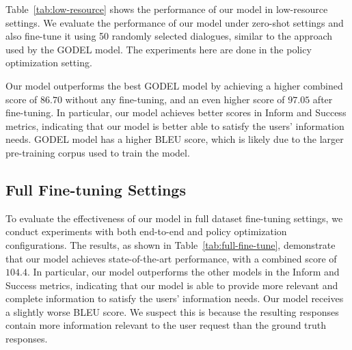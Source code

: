 Table~\ref{tab:low-resource} shows the performance of our model in low-resource settings.
We evaluate the performance of our model under zero-shot settings and also fine-tune it using 50 randomly selected dialogues, similar to the approach used by the GODEL model.
The experiments here are done in the policy optimization setting.

Our model outperforms the best GODEL model by achieving a higher combined score of $86.70$ without any fine-tuning, and an even higher score of $97.05$ after fine-tuning.
In particular, our model achieves better scores in Inform and Success metrics, indicating that our model is better able to satisfy the users' information needs.
GODEL model has a higher BLEU score, which is likely due to the larger pre-training corpus used to train the model.

\subsection{Full Fine-tuning Settings}

To evaluate the effectiveness of our model in full dataset fine-tuning settings, we conduct experiments with both end-to-end and policy optimization configurations. 
The results, as shown in Table~\ref{tab:full-fine-tune}, demonstrate that our model achieves state-of-the-art performance, with a combined score of $104.4$. 
In particular, our model outperforms the other models in the Inform and Success metrics, indicating that our model is able to provide more relevant and complete information to satisfy the users' information needs.
Our model receives a slightly worse BLEU score. We suspect this is because the resulting responses contain more information relevant to the user request than the ground truth responses.

\begin{table}[t]
    \centering
    \caption{Ablation studies for end-to-end full training settings and zero-shot policy optimization settings.}
    \label{tab:ablation}
\end{table}

